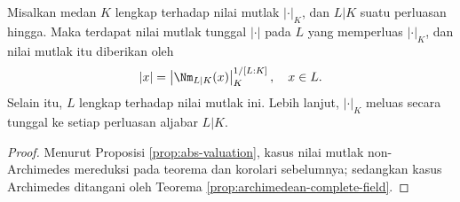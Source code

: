 \begin{corollary}
	Misalkan medan $K$ lengkap terhadap nilai mutlak $|\cdot|_K$, dan $L|K$ suatu perluasan hingga. Maka terdapat nilai mutlak tunggal $|\cdot|$ pada $L$ yang memperluas $|\cdot|_K$, dan nilai mutlak itu diberikan oleh
	\[ |x| = \left| \Nm_{L|K}(x) \right|_K^{1/[L:K]}, \quad x \in L. \]
	Selain itu, $L$ lengkap terhadap nilai mutlak ini. Lebih lanjut, $|\cdot|_K$ meluas secara tunggal ke setiap perluasan aljabar $L|K$.
\end{corollary}
\begin{proof}
	Menurut Proposisi \ref{prop:abs-valuation}, kasus nilai mutlak non-Archimedes mereduksi pada teorema dan korolari sebelumnya; sedangkan kasus Archimedes ditangani oleh Teorema \ref{prop:archimedean-complete-field}.
\end{proof}

